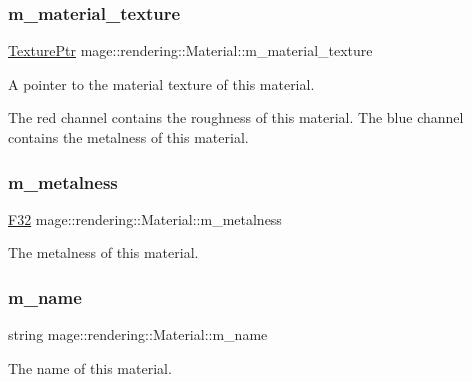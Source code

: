 \subsubsection{\texorpdfstring{m\+\_\+material\+\_\+texture}{m\_material\_texture}}
{\footnotesize\ttfamily \hyperlink{namespacemage_1_1rendering_a6f3ae54f825328465b0cdde0f0de4a36}{Texture\+Ptr} mage\+::rendering\+::\+Material\+::m\+\_\+material\+\_\+texture\hspace{0.3cm}{\ttfamily [private]}}

A pointer to the material texture of this material.

The red channel contains the roughness of this material. The blue channel contains the metalness of this material. \hypertarget{classmage_1_1rendering_1_1_material_a1ec138a6dfec09ac421517480bd08a75}{}\label{classmage_1_1rendering_1_1_material_a1ec138a6dfec09ac421517480bd08a75} 
\subsubsection{\texorpdfstring{m\+\_\+metalness}{m\_metalness}}
{\footnotesize\ttfamily \hyperlink{namespacemage_aa97e833b45f06d60a0a9c4fc22ae02c0}{F32} mage\+::rendering\+::\+Material\+::m\+\_\+metalness\hspace{0.3cm}{\ttfamily [private]}}

The metalness of this material. \hypertarget{classmage_1_1rendering_1_1_material_a16f309220930c59f17b25fd8b0b62446}{}\label{classmage_1_1rendering_1_1_material_a16f309220930c59f17b25fd8b0b62446} 
\subsubsection{\texorpdfstring{m\+\_\+name}{m\_name}}
{\footnotesize\ttfamily string mage\+::rendering\+::\+Material\+::m\+\_\+name\hspace{0.3cm}{\ttfamily [private]}}

The name of this material. \hypertarget{classmage_1_1rendering_1_1_material_a14911430f38bc998c6d0735dc129f234}{}\label{classmage_1_1rendering_1_1_material_a14911430f38bc998c6d0735dc129f234} 
